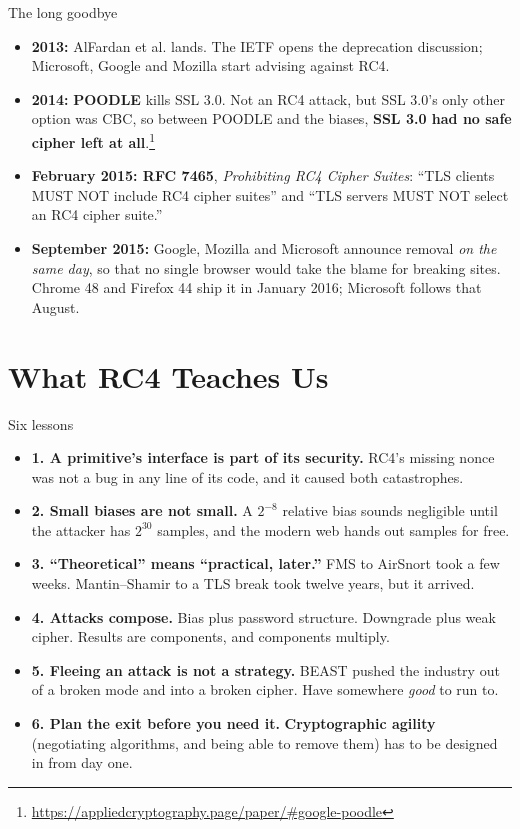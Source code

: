 \ifdefined\PRESENTATION\else\PassOptionsToClass{handout}{beamer}\fi\documentclass[aspectratio=169, lualatex]{beamer}
\begin{document}
\begin{frame}{The long goodbye}
	\begin{itemize}[<+->]
		\item \textbf{2013:} AlFardan et al. lands. The IETF opens the deprecation discussion; Microsoft, Google and Mozilla start advising against RC4.
		\item \textbf{2014:} \textbf{POODLE} kills SSL 3.0. Not an RC4 attack, but SSL 3.0's only other option was CBC, so between POODLE and the biases, \textbf{SSL 3.0 had no safe cipher left at all}.\footnote{\url{https://appliedcryptography.page/paper/\#google-poodle}}
		\item \textbf{February 2015: RFC 7465}, \textit{Prohibiting RC4 Cipher Suites}: ``TLS clients MUST NOT include RC4 cipher suites'' and ``TLS servers MUST NOT select an RC4 cipher suite.''
		\item \textbf{September 2015:} Google, Mozilla and Microsoft announce removal \emph{on the same day}, so that no single browser would take the blame for breaking sites. Chrome 48 and Firefox 44 ship it in January 2016; Microsoft follows that August.
	\end{itemize}
\end{frame}

\section{What RC4 Teaches Us}

\begin{frame}{Six lessons}
	\begin{itemize}[<+->]
		\item \textbf{1. A primitive's interface is part of its security.} RC4's missing nonce was not a bug in any line of its code, and it caused both catastrophes.
		\item \textbf{2. Small biases are not small.} A $2^{-8}$ relative bias sounds negligible until the attacker has $2^{30}$ samples, and the modern web hands out samples for free.
		\item \textbf{3. ``Theoretical'' means ``practical, later.''} FMS to AirSnort took a few weeks. Mantin--Shamir to a TLS break took twelve years, but it arrived.
		\item \textbf{4. Attacks compose.} Bias plus password structure. Downgrade plus weak cipher. Results are components, and components multiply.
		\item \textbf{5. Fleeing an attack is not a strategy.} BEAST pushed the industry out of a broken mode and into a broken cipher. Have somewhere \emph{good} to run to.
		\item \textbf{6. Plan the exit before you need it.} \textbf{Cryptographic agility} (negotiating algorithms, and being able to remove them) has to be designed in from day one.
	\end{itemize}
\end{frame}
\end{document}
